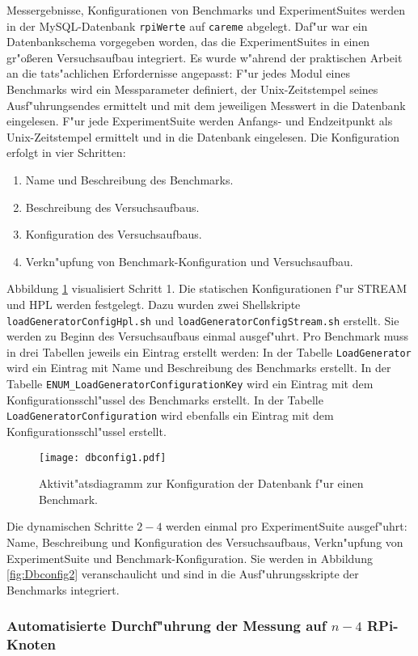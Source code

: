 {Messergebnisse, Konfigurationen von Benchmarks und ExperimentSuites werden in der MySQL-Datenbank \texttt{rpiWerte} auf \texttt{careme} abgelegt. Daf"ur war ein Datenbankschema vorgegeben worden, das die ExperimentSuites in einen gr"o\ss eren Versuchsaufbau integriert. Es wurde w"ahrend der praktischen Arbeit an die tats"achlichen Erfordernisse angepasst: F"ur jedes Modul eines Benchmarks wird ein Messparameter definiert, der Unix-Zeitstempel seines Ausf"uhrungsendes ermittelt und mit dem jeweiligen Messwert in die Datenbank eingelesen. F"ur jede ExperimentSuite werden Anfangs- und Endzeitpunkt als Unix-Zeitstempel ermittelt und in die Datenbank eingelesen. Die Konfiguration erfolgt in vier Schritten:  
\begin{enumerate}%
	\item Name und Beschreibung des Benchmarks. 
	\item Beschreibung des Versuchsaufbaus. 
	\item Konfiguration des Versuchsaufbaus. 
	\item Verkn"upfung von Benchmark-Konfiguration und Versuchsaufbau.
\end{enumerate} 
Abbildung \ref{fig:Dbconfig1} visualisiert Schritt 1. Die statischen Konfigurationen f"ur STREAM und HPL werden festgelegt. Dazu wurden zwei Shellskripte \texttt{loadGeneratorCon\-figHpl.sh} und \texttt{loadGe\-nerator\-ConfigStream.sh} erstellt. Sie werden zu Beginn des Versuchsaufbaus einmal ausgef"uhrt. Pro Benchmark muss in drei Tabellen jeweils ein Eintrag erstellt werden: In der Tabelle \texttt{LoadGenerator} wird ein Eintrag mit Name und Beschreibung des Benchmarks erstellt. In der Tabelle \texttt{ENUM\_LoadGeneratorConfigura\-tionKey} wird ein Eintrag mit dem Konfigurationsschl"ussel des Benchmarks erstellt. In der Tabelle \texttt{LoadGeneratorConfiguration} wird ebenfalls ein Eintrag mit dem Konfigurationsschl"ussel erstellt.
\begin{figure}[htb]
\centering
\texttt{[image: dbconfig1.pdf]}
\caption{Aktivit"atsdiagramm zur Konfiguration der Datenbank f"ur einen Benchmark.}
\label{fig:Dbconfig1}
\end{figure}
Die dynamischen Schritte $2-4$ werden einmal pro ExperimentSuite ausgef"uhrt: Name, Beschreibung und Konfiguration des Versuchsaufbaus, Verkn"upfung von ExperimentSuite und Benchmark-Konfiguration. Sie werden in Abbildung \ref{fig:Dbconfig2} veranschaulicht und sind in die Ausf"uhrungsskripte der Benchmarks integriert. 

\subsubsection{Automatisierte Durchf"uhrung der Messung auf $n-4$ RPi-Knoten} 

}
